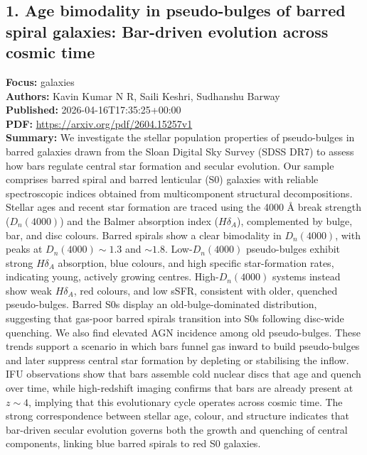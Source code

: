 \documentclass[11pt]{article}
\begin{document}
\subsection*{1. Age bimodality in pseudo-bulges of barred spiral galaxies: Bar-driven evolution across cosmic time}
\textbf{Focus:} galaxies\\
\textbf{Authors:} Kavin Kumar N R, Saili Keshri, Sudhanshu Barway\\
\textbf{Published:} 2026-04-16T17:35:25+00:00\\
\textbf{PDF:} \href{https://arxiv.org/pdf/2604.15257v1}{https://arxiv.org/pdf/2604.15257v1}\\
\textbf{Summary:}
We investigate the stellar population properties of pseudo-bulges in barred galaxies drawn from the Sloan Digital Sky Survey (SDSS DR7) to assess how bars regulate central star formation and secular evolution. Our sample comprises barred spiral and barred lenticular (S0) galaxies with reliable spectroscopic indices obtained from multicomponent structural decompositions. Stellar ages and recent star formation are traced using the 4000 Å break strength ($D_{n}(4000)$) and the Balmer absorption index ($H\delta _{A}$), complemented by bulge, bar, and disc colours. Barred spirals show a clear bimodality in $D_{n}(4000)$, with peaks at $D_{n}(4000)\sim1.3$ and $\sim1.8$. Low-$D_{n}(4000)$ pseudo-bulges exhibit strong $H\delta _{A}$ absorption, blue colours, and high specific star-formation rates, indicating young, actively growing centres. High-$D_{n}(4000)$ systems instead show weak $H\delta _{A}$, red colours, and low sSFR, consistent with older, quenched pseudo-bulges. Barred S0s display an old-bulge-dominated distribution, suggesting that gas-poor barred spirals transition into S0s following disc-wide quenching. We also find elevated AGN incidence among old pseudo-bulges. These trends support a scenario in which bars funnel gas inward to build pseudo-bulges and later suppress central star formation by depleting or stabilising the inflow. IFU observations show that bars assemble cold nuclear discs that age and quench over time, while high-redshift imaging confirms that bars are already present at $z\sim4$, implying that this evolutionary cycle operates across cosmic time. The strong correspondence between stellar age, colour, and structure indicates that bar-driven secular evolution governs both the growth and quenching of central components, linking blue barred spirals to red S0 galaxies.
\newpage
\end{document}
